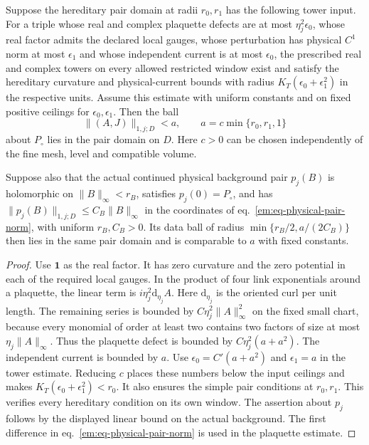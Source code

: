 \documentclass[11pt,letterpaper,reqno]{amsart}
\makeatletter
\numberwithin{equation}{section}
\renewcommand{\eqref}[1]{\textup{eq.~\ref{#1}}}
\theoremstyle{definition}
\newcommand{\ms@minorstart}{%
  \pushQED{\qed}\renewcommand{\qedsymbol}{$\blacksquare$}}
\newenvironment{lemma}[1][]{\ms@minorstart\ms@lemma[#1]}
  {\popQED\endms@lemma}
\theoremstyle{remark}
\makeatother
\begin{document}
\begin{lemma}[A physical ball in the pair domain]
\label{em:lem-physical-radius}
Suppose the hereditary pair domain at radii $r_0,r_1$ has the following
tower input. For a triple whose real and complex plaquette defects
are at most $\eta_j^2\epsilon_0$, whose real factor admits the declared
local gauges, whose perturbation has physical $C^1$ norm at most
$\epsilon_1$ and whose independent current is at most $\epsilon_0$,
the prescribed real and complex towers on every allowed restricted
window exist and satisfy the hereditary curvature and physical-current
bounds with radius $K_T(\epsilon_0+\epsilon_1^2)$ in the respective
units. Assume this estimate with uniform constants and on fixed
positive ceilings for $\epsilon_0,\epsilon_1$.
Then the ball
\[
       \|(A,J)\|_{1,j;D}< a,
       \qquad a=c\min\{r_0,r_1,1\}
\]
about $P_\circ$ lies in the pair domain on $D$. Here $c>0$ can be
chosen independently of the fine mesh, level and compatible volume.

Suppose also that the actual continued physical background pair
$p_j(B)$ is holomorphic on $\|B\|_\infty<r_B$, satisfies
$p_j(0)=P_\circ$, and has $\|p_j(B)\|_{1,j;D}\le C_B\|B\|_\infty$
in the coordinates of \eqref{em:eq-physical-pair-norm}, with uniform
$r_B,C_B>0$. Its data ball of radius
$\min\{r_B/2,a/(2C_B)\}$ then lies in the same pair domain and
is comparable to $a$ with fixed constants.
\end{lemma}

\begin{proof}
Use $\mathbf 1$ as the real factor. It has zero curvature and the
zero potential in each of the required local gauges. In the product
of four link exponentials around a plaquette, the linear term is
$i\eta_j^2\mathrm d_{\eta_j}A$. Here $\mathrm d_{\eta_j}$ is the
oriented curl per unit length. The remaining series is bounded by
$C\eta_j^2\|A\|_\infty^2$ on the fixed small chart, because every
monomial of order at least two contains two factors of size at most
$\eta_j\|A\|_\infty$. Thus the plaquette defect is bounded by
$C\eta_j^2(a+a^2)$. The independent current is bounded by $a$.
Use $\epsilon_0=C'(a+a^2)$ and $\epsilon_1=a$ in the tower estimate.
Reducing $c$ places these numbers below the input ceilings and makes
$K_T(\epsilon_0+\epsilon_1^2)<r_0$. It also ensures the simple pair
conditions at $r_0,r_1$. This verifies every hereditary condition
on its own window. The assertion about $p_j$ follows by the displayed
linear bound on the actual background. The first difference in
\eqref{em:eq-physical-pair-norm} is used in the plaquette estimate.
\end{proof}
\end{document}
